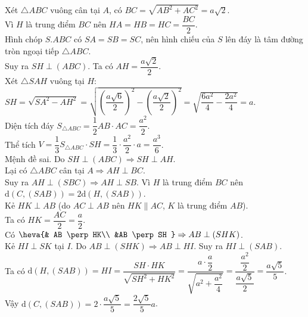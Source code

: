 \begin{ex}
{\begin{center}
\begin{tikzpicture}[scale=1, line join=round, line cap=round, >=stealth]
			\end{tikzpicture}
		\end{center}
		\begin{itemchoice}
			\itemch Xét $\triangle ABC$ vuông cân tại $A$, có $BC = \sqrt{AB^2+AC^2} = a\sqrt{2}$.\\
			Vì $H$ là trung điểm $BC$ nên $HA=HB=HC=\dfrac{BC}{2}$.\\
			Hình chóp $S.ABC$ có $SA=SB=SC$, nên hình chiếu của $S$ lên đáy là tâm đường tròn ngoại tiếp $\triangle ABC$.\\
			Suy ra $SH \perp (ABC)$.
			\itemch Ta có $AH = \dfrac{a\sqrt{2}}{2}$.\\
			Xét $\triangle SAH$ vuông tại $H$: $SH = \sqrt{SA^2 - AH^2} = \sqrt{\left(\dfrac{a\sqrt{6}}{2}\right)^2 - \left(\dfrac{a\sqrt{2}}{2}\right)^2} = \sqrt{\dfrac{6a^2}{4} - \dfrac{2a^2}{4}} = a$.\\
			Diện tích đáy $S_{\triangle ABC} = \dfrac{1}{2} AB \cdot AC = \dfrac{a^2}{2}$.\\
			Thể tích $V = \dfrac{1}{3} S_{\triangle ABC} \cdot SH = \dfrac{1}{3} \cdot \dfrac{a^2}{2} \cdot a = \dfrac{a^3}{6}$.\\
			Mệnh đề sai.
			\itemch Do $SH \perp (ABC) \Rightarrow SH \perp AH$.\\
			Lại có $\triangle ABC$ cân tại $A \Rightarrow AH \perp BC$.\\
			Suy ra $AH\perp (SBC) \Rightarrow AH \perp SB$.
			\itemch Vì $H$ là trung điểm $BC$ nên $\mathrm{d}(C,(SAB)) = 2 \mathrm{d}(H,(SAB))$.\\
			Kẻ $HK \perp AB$ (do $AC \perp AB$ nên $HK \parallel AC$, $K$ là trung điểm $AB$).\\
			Ta có $HK = \dfrac{AC}{2} = \dfrac{a}{2}$.\\
			Có $\heva{& AB \perp HK\\ &AB \perp SH } \Rightarrow AB \perp (SHK)$.\\
			Kẻ $HI \perp SK$ tại $I$. Do $AB \perp (SHK) \Rightarrow AB \perp HI$. Suy ra $HI \perp (SAB)$.\\
			Ta có $\mathrm{d}(H,(SAB)) = HI = \dfrac{SH \cdot HK}{\sqrt{SH^2 + HK^2}} = \dfrac{a \cdot \dfrac{a}{2}}{\sqrt{a^2 + \dfrac{a^2}{4}}} = \dfrac{\dfrac{a^2}{2}}{\dfrac{a\sqrt{5}}{2}} = \dfrac{a\sqrt{5}}{5}$.\\
			Vậy $\mathrm{d}(C,(SAB)) = 2 \cdot \dfrac{a\sqrt{5}}{5} = \dfrac{2\sqrt{5}}{5}a$.
		\end{itemchoice}
	}
\end{ex}

